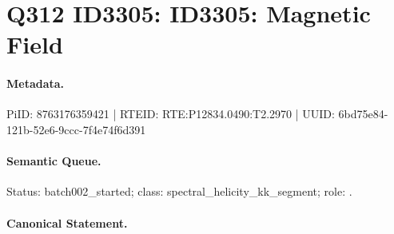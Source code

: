 \section*{Q312 ID3305: ID3305: Magnetic Field}
\paragraph{Metadata.}
PiID: 8763176359421 | RTEID: RTE:P12834.0490:T2.2970 | UUID: 6bd75e84-121b-52e6-9ccc-7f4e74f6d391

\paragraph{Semantic Queue.}
Status: batch002\_started; class: spectral\_helicity\_kk\_segment; role: .

\paragraph{Canonical Statement.}
